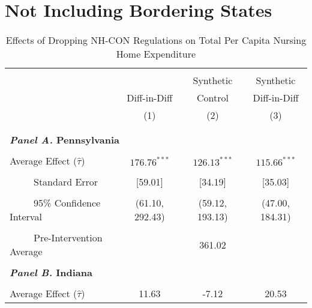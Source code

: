 \documentclass[../Main.tex]{subfiles}
\begin{document}



\section{Not Including Bordering States}


\newpage
\null
\vfill
\begin{table}[htbp]\centering \footnotesize
\def\sym#1{\ifmmode^{#1}\else\(^{#1}\)\fi}
\captionsetup{width=.78\textwidth}
\caption{\centering Effects of Dropping NH-CON Regulations on Total Per Capita Nursing Home Expenditure}
\label{tab:ave_results_tot_exp}
\setlength{\tabcolsep}{10pt}
\begin{tabular}{l*{3}{c}}
\hline\hline
\\[-2ex]
&\multicolumn{1}{c}{}&\multicolumn{1}{c}{Synthetic}&\multicolumn{1}{c}{Synthetic}\\
&\multicolumn{1}{c}{Diff-in-Diff}&\multicolumn{1}{c}{Control}&\multicolumn{1}{c}{Diff-in-Diff}\\
&\multicolumn{1}{c}{(1)}&\multicolumn{1}{c}{(2)}&\multicolumn{1}{c}{(3)}\\
\\[-2ex]
\hline
\\[-.1ex]
\multicolumn{4}{l}{\textbf{\textit{Panel A.} Pennsylvania}}\\
\\[-1.5ex]
\multicolumn{1}{l}{Average Effect ($\hat{\tau}$)}&   \multicolumn{1}{c}{$176.76^{***}$}&   \multicolumn{1}{c}{$126.13^{***}$}&  \multicolumn{1}{c}{$115.66^{***}$}\\
\\[-2ex]
\multicolumn{1}{l}{\ \ \ \ \ Standard Error}  &\multicolumn{1}{c}{[59.01]}&\multicolumn{1}{c}{[34.19]}&\multicolumn{1}{c}{[35.03]}\\
\\[-2ex]
\multicolumn{1}{l}{\ \ \ \ \ 95\% Confidence Interval}&   \multicolumn{1}{c}{(61.10, 292.43)}&   \multicolumn{1}{c}{(59.12, 193.13)}&   \multicolumn{1}{c}{(47.00, 184.31)}\\
\\[-2ex]
\multicolumn{1}{l}{\ \ \ \ \ Pre-Intervention Average}&   \multicolumn{3}{c}{361.02}\\
\\[-.1ex]
\multicolumn{4}{l}{\textbf{\textit{Panel B.} Indiana}}\\
\\[-1.5ex]
\multicolumn{1}{l}{Average Effect ($\hat{\tau}$)}&   \multicolumn{1}{c}{11.63}&   \multicolumn{1}{c}{-7.12}&  \multicolumn{1}{c}{20.53}\\

\end{tabular}
\end{table}
\end{document}

